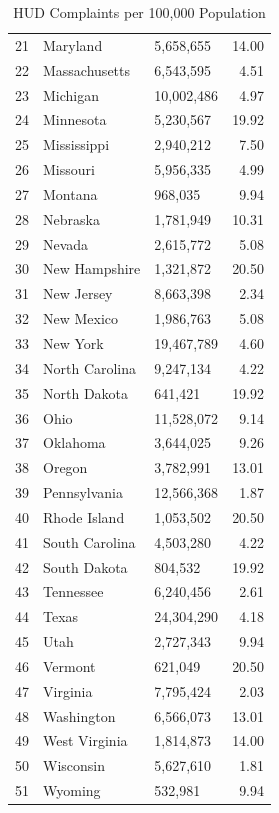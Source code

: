 \documentclass{article}
\begin{document}
\begin{table}[ht]
\begin{tabular}{rllr}
  21 & Maryland & 5,658,655 & 14.00 \\ 
  22 & Massachusetts & 6,543,595 & 4.51 \\ 
  23 & Michigan & 10,002,486 & 4.97 \\ 
  24 & Minnesota & 5,230,567 & 19.92 \\ 
  25 & Mississippi & 2,940,212 & 7.50 \\ 
  26 & Missouri & 5,956,335 & 4.99 \\ 
  27 & Montana & 968,035 & 9.94 \\ 
  28 & Nebraska & 1,781,949 & 10.31 \\ 
  29 & Nevada & 2,615,772 & 5.08 \\ 
  30 & New Hampshire & 1,321,872 & 20.50 \\ 
  31 & New Jersey & 8,663,398 & 2.34 \\ 
  32 & New Mexico & 1,986,763 & 5.08 \\ 
  33 & New York & 19,467,789 & 4.60 \\ 
  34 & North Carolina & 9,247,134 & 4.22 \\ 
  35 & North Dakota & 641,421 & 19.92 \\ 
  36 & Ohio & 11,528,072 & 9.14 \\ 
  37 & Oklahoma & 3,644,025 & 9.26 \\ 
  38 & Oregon & 3,782,991 & 13.01 \\ 
  39 & Pennsylvania & 12,566,368 & 1.87 \\ 
  40 & Rhode Island & 1,053,502 & 20.50 \\ 
  41 & South Carolina & 4,503,280 & 4.22 \\ 
  42 & South Dakota & 804,532 & 19.92 \\ 
  43 & Tennessee & 6,240,456 & 2.61 \\ 
  44 & Texas & 24,304,290 & 4.18 \\ 
  45 & Utah & 2,727,343 & 9.94 \\ 
  46 & Vermont & 621,049 & 20.50 \\ 
  47 & Virginia & 7,795,424 & 2.03 \\ 
  48 & Washington & 6,566,073 & 13.01 \\ 
  49 & West Virginia & 1,814,873 & 14.00 \\ 
  50 & Wisconsin & 5,627,610 & 1.81 \\ 
  51 & Wyoming & 532,981 & 9.94 \\ 
   \hline
\end{tabular}
\caption{HUD Complaints per 100,000 Population} 
\label{tab:HUDComplaints}
\end{table}
\end{document}
